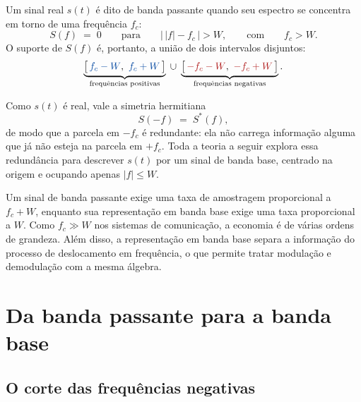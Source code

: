 \documentclass[11pt,a4paper]{article}
\begin{document}
Um sinal real $s(t)$ é dito de banda passante quando seu espectro se concentra em torno de uma frequência $f_c$:
\begin{equation}
  S(f) \;=\; 0 \qquad \text{para} \qquad \bigl|\,|f| - f_c\,\bigr| > W,
  \qquad\text{com}\qquad f_c > W .
  \label{eq:def_banda_passante}
\end{equation}
O suporte de $S(f)$ é, portanto, a união de dois intervalos disjuntos:
\begin{equation}
  \underbrace{\bigl[\,\textcolor{azul}{f_c-W},\ \textcolor{azul}{f_c+W}\,\bigr]}_{\text{frequências positivas}}
  \;\cup\;
  \underbrace{\bigl[\,\textcolor{vermelho}{-f_c-W},\ \textcolor{vermelho}{-f_c+W}\,\bigr]}_{\text{frequências negativas}} .
  \label{eq:suporte_bp}
\end{equation}

Como $s(t)$ é real, vale a simetria hermitiana
\begin{equation}
  S(-f) \;=\; S^{*}(f),
  \label{eq:hermitiana}
\end{equation}
de modo que a parcela em $-f_c$ é redundante: ela não carrega informação alguma que já não esteja na parcela em $+f_c$. Toda a teoria a seguir explora essa redundância para descrever $s(t)$ por um sinal de banda base, centrado na origem e ocupando apenas $|f| \le W$.

\begin{observacao}
Um sinal de banda passante exige uma taxa de amostragem proporcional a $f_c + W$, enquanto sua representação em banda base exige uma taxa proporcional a $W$. Como $f_c \gg W$ nos sistemas de comunicação, a economia é de várias ordens de grandeza. Além disso, a representação em banda base separa a informação do processo de deslocamento em frequência, o que permite tratar modulação e demodulação com a mesma álgebra.
\end{observacao}

\section{Da banda passante para a banda base}

\subsection{O corte das frequências negativas}
\end{document}

